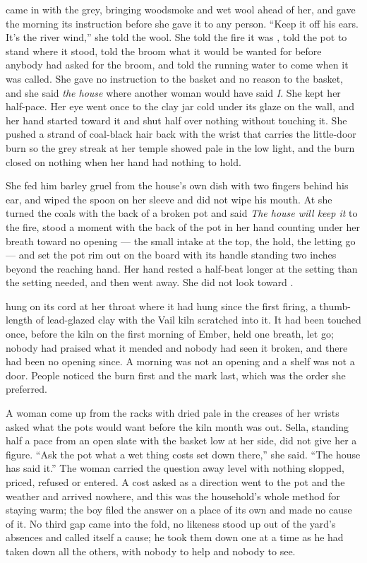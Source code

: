  came in with the grey, bringing woodsmoke and wet wool ahead of her, and gave the morning its instruction before she gave it to any person. “Keep it off his ears. It's the river wind,” she told the wool. She told the fire it was , told the pot to stand where it stood, told the broom what it would be wanted for before anybody had asked for the broom, and told the running water to come when it was called. She gave no instruction to the basket and no reason to the basket, and she said \emph{the house} where another woman would have said \emph{I}. She kept her half-pace. Her eye went once to the clay jar cold under its glaze on the wall, and her hand started toward it and shut half over nothing without touching it. She pushed a strand of coal-black hair back with the wrist that carries the little-door burn so the grey streak at her temple showed pale in the low light, and the burn closed on nothing when her hand had nothing to hold.

She fed him barley gruel from the house's own dish with two fingers behind his ear, and wiped the spoon on her sleeve and did not wipe his mouth. At  she turned the coals with the back of a broken pot and said \emph{The house will keep it} to the fire, stood a moment with the back of the pot in her hand counting under her breath toward no opening --- the small intake at the top, the hold, the letting go --- and set the pot rim out on the board with its handle standing two inches beyond the reaching hand. Her hand rested a half-beat longer at the setting than the setting needed, and then went away. She did not look toward .

 hung on its cord at her throat where it had hung since the first firing, a thumb-length of lead-glazed clay with the Vail kiln scratched into it. It had been touched once, before the kiln on the first morning of Ember, held one breath, let go; nobody had praised what it mended and nobody had seen it broken, and there had been no opening since. A morning was not an opening and a shelf was not a door. People noticed the burn first and the mark last, which was the order she preferred.

A woman come up from the racks with  dried pale in the creases of her wrists asked what the pots would want before the kiln month was out. Sella, standing half a pace from an open slate with the basket low at her side, did not give her a figure. “Ask the pot what a wet thing costs set down there,” she said. “The house has said it.” The woman carried the question away level with nothing slopped, priced, refused or entered. A cost asked as a direction went to the pot and the weather and arrived nowhere, and this was the household's whole method for staying warm; the boy filed the answer on a place of its own and made no cause of it. No third gap came into the fold, no likeness stood up out of the yard's absences and called itself a cause; he took them down one at a time as he had taken down all the others, with nobody to help and nobody to see.

